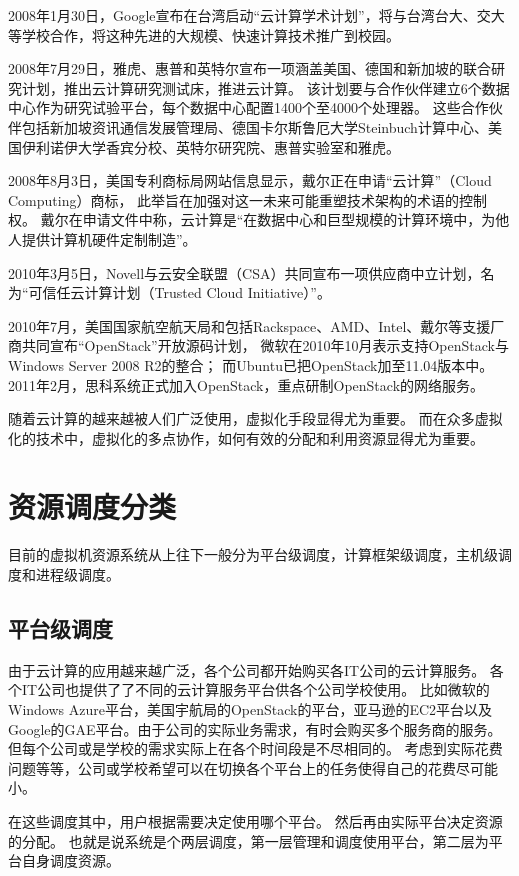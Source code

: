 2008年1月30日，Google宣布在台湾启动“云计算学术计划”，将与台湾台大、交大等学校合作，将这种先进的大规模、快速计算技术推广到校园。

2008年7月29日，雅虎、惠普和英特尔宣布一项涵盖美国、德国和新加坡的联合研究计划，推出云计算研究测试床，推进云计算。
该计划要与合作伙伴建立6个数据中心作为研究试验平台，每个数据中心配置1400个至4000个处理器。
这些合作伙伴包括新加坡资讯通信发展管理局、德国卡尔斯鲁厄大学Steinbuch计算中心、美国伊利诺伊大学香宾分校、英特尔研究院、惠普实验室和雅虎。

2008年8月3日，美国专利商标局网站信息显示，戴尔正在申请“云计算”（Cloud Computing）商标，
此举旨在加强对这一未来可能重塑技术架构的术语的控制权。
戴尔在申请文件中称，云计算是“在数据中心和巨型规模的计算环境中，为他人提供计算机硬件定制制造”。

2010年3月5日，Novell与云安全联盟（CSA）共同宣布一项供应商中立计划，名为“可信任云计算计划（Trusted Cloud Initiative）”。

2010年7月，美国国家航空航天局和包括Rackspace、AMD、Intel、戴尔等支援厂商共同宣布“OpenStack”开放源码计划，
微软在2010年10月表示支持OpenStack与Windows Server 2008 R2的整合；
而Ubuntu已把OpenStack加至11.04版本中。
2011年2月，思科系统正式加入OpenStack，重点研制OpenStack的网络服务。

随着云计算的越来越被人们广泛使用，虚拟化手段显得尤为重要。
而在众多虚拟化的技术中，虚拟化的多点协作，如何有效的分配和利用资源显得尤为重要。

\section{资源调度分类}
目前的虚拟机资源系统从上往下一般分为平台级调度，计算框架级调度，主机级调度和进程级调度。
\subsection{平台级调度}
由于云计算的应用越来越广泛，各个公司都开始购买各IT公司的云计算服务。
各个IT公司也提供了了不同的云计算服务平台供各个公司学校使用。
比如微软的Windows Azure平台，美国宇航局的OpenStack的平台，亚马逊的EC2平台以及
Google的GAE平台。由于公司的实际业务需求，有时会购买多个服务商的服务\cite{ref1,ref3}。
但每个公司或是学校的需求实际上在各个时间段是不尽相同的。
考虑到实际花费问题等等，公司或学校希望可以在切换各个平台上的任务使得自己的花费尽可能小。

在这些调度其中，用户根据需要决定使用哪个平台。
然后再由实际平台决定资源的分配。
也就是说系统是个两层调度，第一层管理和调度使用平台，第二层为平台自身调度资源。

